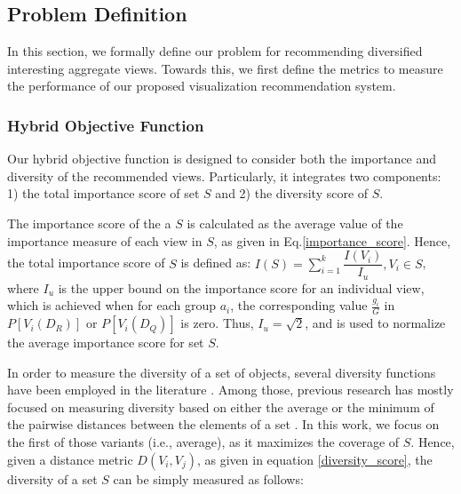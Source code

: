 
\subsection{Problem Definition}\label{subsec:problem_definition}
In this section, we formally define our problem for recommending diversified interesting aggregate views.  
%
Towards this, we first define the metrics to measure the performance of our proposed visualization recommendation system.


\subsubsection{Hybrid Objective Function}

Our hybrid objective function is designed to consider both the importance and diversity of the recommended views. 
%
Particularly, it integrates two components: 1) the total importance score of set $S$ and 2) the diversity score of $S$.

The importance score of the a $S$ is calculated as the average value of the importance measure of each view in $S$, as given in Eq.\ref{importance_score}. 
%
Hence, the total importance score of $S$ is defined as: $ I\left(S\right)= \sum_{i=1}^{k} \dfrac{I(V_i )}{I_u}, V_i  \in S $, where $I_u$ is the upper bound on the importance score for an individual view, which is achieved when for each group $a_i$, the corresponding value $\frac{g_i}{G}$ in $P[V_{i}(D_R)]$ or $P[V_{i}(D_Q)]$ is zero. Thus, $I_u = \sqrt{2}$, and is used to normalize the average importance score for set $S$. 

In order to measure the diversity of a set of objects, several diversity functions have been employed in the literature \cite{Vieira2011, Clarke2008}. 
%
Among those, previous research has mostly focused on measuring diversity based on either the average or the minimum of the pairwise distances between the elements of a set \cite{Wu2014}. 
%
In this work, we focus on the first of those variants (i.e., average), as it maximizes the coverage of $S$. 
%
Hence, given a distance metric $ D\left(V_i, V_j\right) $, as given in equation \ref{diversity_score}, the diversity of a set $S$ can be simply measured as follows:

